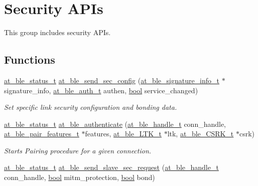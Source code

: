 \hypertarget{group__gap__sec__group}{}\section{Security A\+P\+Is}
\label{group__gap__sec__group}


This group includes security A\+P\+Is.  


\subsection*{Functions}
\begin{DoxyCompactItemize}
\item 
\mbox{\hyperlink{group__error__codes__group_ga3b1db9b95feb157b3c188ca27fe76988}{at\+\_\+ble\+\_\+status\+\_\+t}} \mbox{\hyperlink{group__gap__sec__group_ga57471b414b6b1b5aa57c540db43b4453}{at\+\_\+ble\+\_\+send\+\_\+sec\+\_\+config}} (\mbox{\hyperlink{structat__ble__signature__info__t}{at\+\_\+ble\+\_\+signature\+\_\+info\+\_\+t}} $\ast$signature\+\_\+info, \mbox{\hyperlink{at__ble__api_8h_a70253ec09a2361d16e15c37f8cb5b97c}{at\+\_\+ble\+\_\+auth\+\_\+t}} authen, \mbox{\hyperlink{group__group__sam0__utils_ga97a80ca1602ebf2303258971a2c938e2}{bool}} service\+\_\+changed)
\begin{DoxyCompactList}\small\item\em Set specific link security configuration and bonding data. \end{DoxyCompactList}\item 
\mbox{\hyperlink{group__error__codes__group_ga3b1db9b95feb157b3c188ca27fe76988}{at\+\_\+ble\+\_\+status\+\_\+t}} \mbox{\hyperlink{group__gap__sec__group_ga937a2436bd501a104500420f4cf82d28}{at\+\_\+ble\+\_\+authenticate}} (\mbox{\hyperlink{at__ble__api_8h_abd23646d0c662860741f787efc8456f2}{at\+\_\+ble\+\_\+handle\+\_\+t}} conn\+\_\+handle, \mbox{\hyperlink{structat__ble__pair__features__t}{at\+\_\+ble\+\_\+pair\+\_\+features\+\_\+t}} $\ast$features, \mbox{\hyperlink{structat__ble___l_t_k__t}{at\+\_\+ble\+\_\+\+L\+T\+K\+\_\+t}} $\ast$ltk, \mbox{\hyperlink{structat__ble___c_s_r_k__t}{at\+\_\+ble\+\_\+\+C\+S\+R\+K\+\_\+t}} $\ast$csrk)
\begin{DoxyCompactList}\small\item\em Starts Pairing procedure for a given connection. \end{DoxyCompactList}\item 
\mbox{\hyperlink{group__error__codes__group_ga3b1db9b95feb157b3c188ca27fe76988}{at\+\_\+ble\+\_\+status\+\_\+t}} \mbox{\hyperlink{group__gap__sec__group_ga7cf7f701912f18b73b6f7c10e8319100}{at\+\_\+ble\+\_\+send\+\_\+slave\+\_\+sec\+\_\+request}} (\mbox{\hyperlink{at__ble__api_8h_abd23646d0c662860741f787efc8456f2}{at\+\_\+ble\+\_\+handle\+\_\+t}} conn\+\_\+handle, \mbox{\hyperlink{group__group__sam0__utils_ga97a80ca1602ebf2303258971a2c938e2}{bool}} mitm\+\_\+protection, \mbox{\hyperlink{group__group__sam0__utils_ga97a80ca1602ebf2303258971a2c938e2}{bool}} bond)

\end{DoxyCompactItemize}
